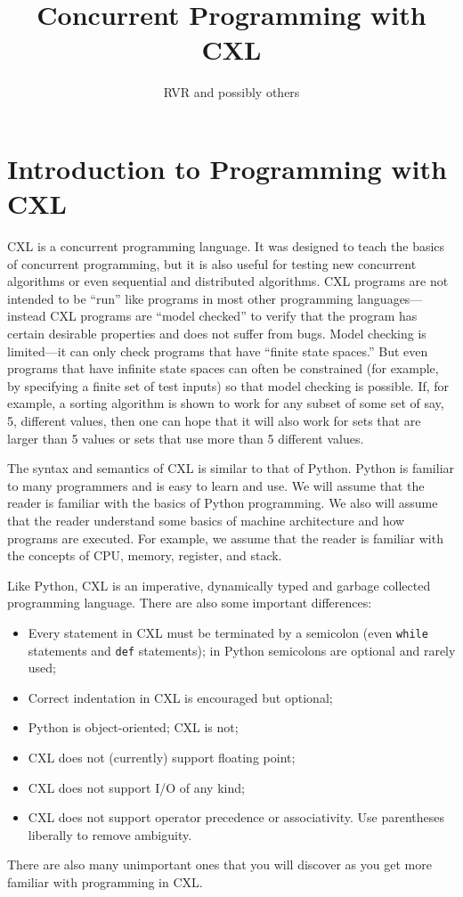 \documentclass{report}
\title{Concurrent Programming with CXL}
\author{RVR and possibly others}
\begin{document}
\maketitle

\chapter{Introduction to Programming with CXL}

CXL is a concurrent programming language.  It was designed to teach
the basics of concurrent programming, but it is also useful for
testing new concurrent algorithms or even sequential and distributed
algorithms.  CXL programs are not intended to be ``run'' like programs
in most other programming languages---instead CXL programs are
``model checked'' to verify that the program has certain desirable
properties and does not suffer from bugs.  Model checking is
limited---it can only check programs that have ``finite state
spaces.''  But even programs that have infinite state spaces can
often be constrained (for example, by specifying a finite set of
test inputs) so that model checking is possible.  If, for
example, a sorting algorithm is shown to work for any subset of
some set of say, 5, different values, then one can hope that it
will also work for sets that are larger than 5 values or sets that
use more than 5 different values.

The syntax and semantics of CXL is similar to that of Python.
Python is familiar to many programmers and is easy to learn and
use.  We will assume that the reader is familiar with the basics
of Python programming.  We also will assume that the reader
understand some basics of machine architecture and how programs
are executed.  For example, we assume that the reader is familiar
with the concepts of CPU, memory, register, and stack.

Like Python, CXL is an imperative,
dynamically typed and garbage collected programming language.
There are also some important differences:
\begin{itemize}
\item Every statement in CXL must be terminated by a semicolon
(even \texttt{while} statements and \texttt{def} statements);
in Python semicolons are optional and rarely used;
\item Correct indentation in CXL is encouraged but optional;
\item Python is object-oriented; CXL is not;
\item CXL does not (currently) support floating point;
\item CXL does not support I/O of any kind;
\item CXL does not support operator precedence or associativity.  Use
parentheses liberally to remove ambiguity.
\end{itemize}
There are also many unimportant ones that you will discover as
you get more familiar with programming in CXL.
\end{document}
